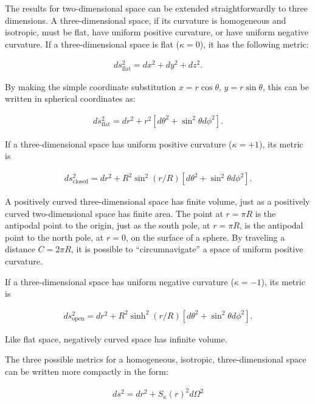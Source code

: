\documentclass[a4paper,11pt]{article}
\begin{document}
{\noindent}The results for two-dimensional space can be extended straightforwardly to three dimensions. A three-dimensional space, if its curvature is homogeneous and isotropic, must be flat, have uniform positive curvature, or have uniform negative curvature. If a three-dimensional space is flat ($\kappa = 0$), it has the following metric:

\begin{align*}
    ds^2_\mathrm{flat} = dx^2 + dy^2 + dz^2.
\end{align*}

{\noindent}By making the simple coordinate substitution $x = r\cos\theta$, $y = r\sin\theta$, this can be written in spherical coordinates as:

\begin{align*}
    ds^2_\mathrm{flat} = dr^2 + r^2[d\theta^2 + \sin^2\theta d\phi^2].
\end{align*}

{\noindent}If a three-dimensional space has uniform positive curvature ($\kappa = +1$), its metric is

\begin{align*}
    ds_\mathrm{closed}^2 = dr^2 + R^2\sin^2(r/R)[d\theta^2 + \sin^2\theta d\phi^2].
\end{align*}

{\noindent}A positively curved three-dimensional space has finite volume, just as a positively curved two-dimensional space has finite area. The point at $r = \pi R$ is the antipodal point to the origin, just as the south pole, at $r = \pi R$, is the antipodal point to the north pole, at $r = 0$, on the surface of a sphere. By traveling a distance $C = 2\pi R$, it is possible to ``circumnavigate'' a space of uniform positive curvature.

{\noindent}If a three-dimensional space has uniform negative curvature ($\kappa =
−1$), its metric is

\begin{align*}
    ds_\mathrm{open}^2 = dr^2 + R^2\sinh^2(r/R)[d\theta^2 + \sin^2\theta d\phi^2].
\end{align*}

{\noindent}Like flat space, negatively curved space has infinite volume.

{\noindent}The three possible metrics for a homogeneous, isotropic, three-dimensional
space can be written more compactly in the form:

\begin{align*}
    ds^2 = dr^2 + S_\kappa(r)^2d\Omega^2
\end{align*}
\end{document}

